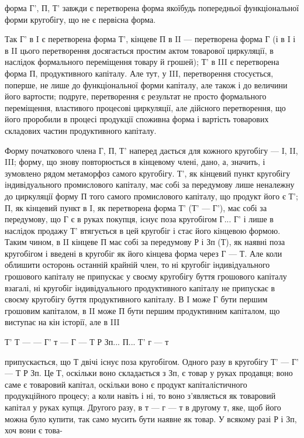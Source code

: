 форма Г', П, Т' завжди є перетворена форма якоїбудь попередньої функціональної форми кругобігу, що
не є первісна форма.

Так Г' в I є перетворена форма Т', кінцеве П в II — перетворена форма Г (і в I і в II цього
перетворення досягається простим актом товарової циркуляції, в наслідок формального переміщення
товару й грошей); Т' в III є перетворена форма П, продуктивного капіталу. Але тут, у III,
перетворення стосується, поперше, не лише до функціональної форми капіталу, але також і до величини
його вартости; подруге, перетворення є результат не просто формального переміщення, властивого
процесові циркуляції, але дійсного перетворення, що його проробили в процесі продукції споживна
форма і вартість товарових складових частин продуктивного капіталу.

Форму початкового члена Г, П, Т' наперед дається для кожного кругобігу — I, II, III; форму, що знову
повторюється в кінцевому члені, дано, а, значить, і зумовлено рядом метаморфоз самого кругобігу. Т',
як кінцевий пункт кругобігу індивідуального промислового капіталу, має собі за передумову лише
неналежну до циркуляції форму П того самого промислового капіталу, що продукт його є Т'; П, як
кінцевий пункт в I, як перетворена форма Т' (Т' — Г'), має собі за передумову, що Г є в руках
покупця, існує поза кругобігом Г... Г' і лише в наслідок продажу Т' втягується в цей кругобіг і стає
його кінцевою формою. Таким чином, в II кінцеве П має собі за передумову Р і Зп (Т), як наявні поза
кругобігом і введені в кругобіг як його кінцева форма через Г — Т. Але коли облишити осторонь
останній крайній член, то ні кругобіг індивідуального грошового капіталу не припускає у своєму
кругобігу буття грошового капіталу взагалі, ні кругобіг індивідуального
продуктивного капіталу не припускає в своєму кругобігу буття продуктивного капіталу. В I може Г бути
першим грошовим капіталом, в II може П бути першим продуктивним капіталом, що виступає на кін
історії, але в III

Т' Т — — Г' т — Г — Т Р Зп... П... Т' г — т

припускається, що Т двічі існує поза кругобігом. Одного разу в кругобігу Т' — Г' — Т Р Зп. Це Т,
оскільки воно складається з Зп, є товар у руках продавця; воно саме є товаровий капітал, оскільки
воно є продукт капіталістичного продукційного процесу; а коли навіть і ні, то воно з’являється як
товаровий капітал у руках купця. Другого разу, в т — г — т в другому т, яке, щоб його можна було
купити, так само мусить бути наявне як товар. У всякому разі Р і Зп, хоч вони є това-
